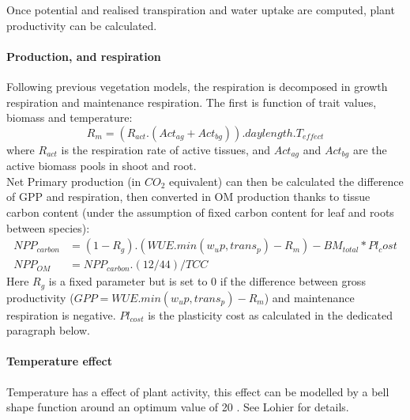 \documentclass[a4paper,twoside, justified,marginals=raggedright, nobib]{tufte-handout}
\begin{document}
\indent Once potential and realised transpiration and water uptake are computed, 
plant productivity can be calculated.


\paragraph{Production, and respiration} Following previous vegetation models, the respiration is decomposed in growth respiration and maintenance respiration. The first is function of trait values, biomass and temperature:
\begin{equation}
R_{m} = \left(R_{act}.\left(Act_{ag} + Act_{bg}\right)\right) . daylength . T_{effect}
\end{equation}
where $R_{act}$ is the respiration rate of active tissues, and $Act_{ag}$ and $Act_{bg}$ are the active biomass pools in shoot and root.\\
\indent Net Primary production (in $CO_{2}$ equivalent) can then be calculated the difference of GPP and respiration, then converted in OM production thanks to tissue carbon content (under the assumption of fixed carbon content for leaf and roots between species):
 \begin{align}
 NPP_{carbon} &= (1- R_{g}) . (WUE . min(w_up, trans_p) - R_{m}) - BM_{total} * Pl_cost\\
 NPP_{OM} &= NPP_{carbon} . (12/44) / TCC
\end{align} 
Here $R_{g}$ is a fixed parameter but is set to $0$ if the difference between gross productivity ($GPP = WUE . min(w_up, trans_p) - R_{m}$) and maintenance respiration is negative. $Pl_{cost}$ is the plasticity cost as calculated in the dedicated paragraph below.

\paragraph{Temperature effect} Temperature has a effect of plant activity, this effect can be modelled by a bell shape function around an optimum value of 20 \celsius . See Lohier for details.
\end{document}
